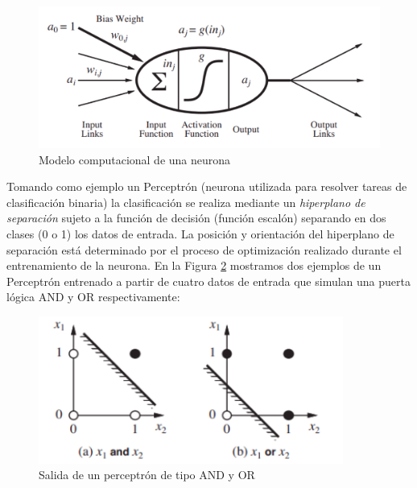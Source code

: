 \begin{figure}[H]
  \begin{center}
    \includegraphics[width=15cm]{imagenes/cap1/neurona.png}
  \end{center}
  \caption[Modelo computacional de una neurona]{Modelo computacional de una neurona \cite{AIMA}}
  \label{fig:neurona}
\end{figure}

Tomando como ejemplo un Perceptrón (neurona utilizada para resolver tareas de clasificación binaria) la clasificación se realiza mediante un \textit{hiperplano de separación} sujeto a la función de decisión (función escalón) separando en dos clases (0 o 1) los datos de entrada. La posición y orientación del hiperplano de separación está determinado por el proceso de optimización realizado durante el entrenamiento de la neurona. En la Figura \ref{fig:salida_perceptron} mostramos dos ejemplos de un Perceptrón entrenado a partir de cuatro datos de entrada que simulan una puerta lógica AND y OR respectivamente:\\

\begin{figure}[H]
  \begin{center}
    \includegraphics[width=10cm]{imagenes/cap1/ejemplo-perceptron.png}
  \end{center}
  \caption[Salida de un perceptrón de tipo AND y OR]{Salida de un perceptrón de tipo AND y OR \cite{AIMA}}
  \label{fig:salida_perceptron}
\end{figure}\

